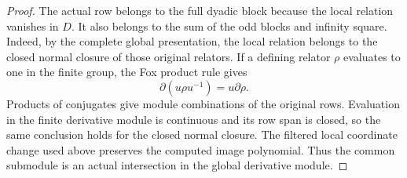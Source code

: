 \begin{proof}
The actual row belongs to the full dyadic block because the local
relation vanishes in $D$. It also belongs to the sum of the odd blocks
and infinity square. Indeed, by the complete global presentation, the
local relation belongs to the closed normal closure of those original
relators. If a defining relator $\rho$ evaluates to one in the finite
group, the Fox product rule gives
\[
 \partial(u\rho u^{-1})=u\partial\rho.
\]
Products of conjugates give module combinations of the original rows.
Evaluation in the finite derivative module is continuous
and its row span is closed, so the same conclusion holds for the closed
normal closure. The filtered local coordinate change used above preserves
the computed image polynomial. Thus the common submodule is an actual
intersection in the global derivative module.
\end{proof}

